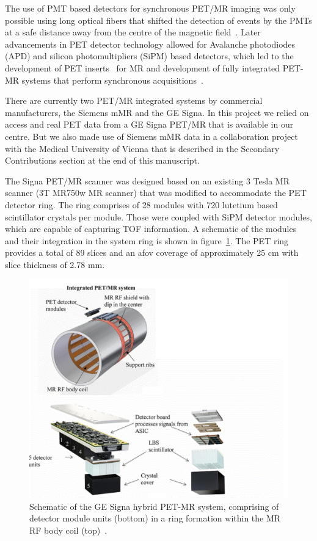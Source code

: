 The use of PMT based detectors for synchronous PET/MR imaging was only possible using long optical fibers that shifted the detection of events by the PMTs at a safe distance away from the centre of the magnetic field~\cite{Shao1997,Mackewn2010}. Later advancements in PET detector technology allowed for Avalanche photodiodes (APD) and silicon photomultipliers (SiPM) based detectors, which led to the development of PET inserts~\cite{Kolb2012} for MR and development of fully integrated PET-MR systems that perform synchronous acquisitions~\cite{Delso2011,Grant2016,Levin2016}.

There are currently two PET/MR integrated systems by commercial manufacturers, the Siemens mMR and the GE Signa. In this project we relied on access and real PET data from a GE Signa PET/MR that is available in our centre. But we also made use of Siemens mMR data in a collaboration project with the Medical University of Vienna that is described in the Secondary Contributions section at the end of this manuscript. 

The Signa PET/MR scanner was designed based on an existing 3 Tesla MR scanner (3T MR750w MR scanner) that was modified to accommodate the PET detector ring. The ring comprises of 28 modules with 720 lutetium based scintillator crystals per module. Those were coupled with SiPM detector modules, which are capable of capturing TOF information. A schematic of the modules and their integration in the system ring is shown in figure~\ref{fig_2:SignaPETMR_Integrated_System}. The PET ring provides a total of 89 slices and an \gls{afov} coverage of approximately 25 cm with slice thickness of 2.78 mm.

\begin{figure} [h!]
\centering
\includegraphics[scale=0.45,angle=0]{2_Theory_Methods/figures/SignaPETMR_Integrated_System.pdf}
\caption{Schematic of the GE Signa hybrid PET-MR system, comprising of detector module units (bottom) in a ring formation within the MR RF body coil (top)~\cite{Levin2016}.} 
\label{fig_2:SignaPETMR_Integrated_System}
\end{figure} 

